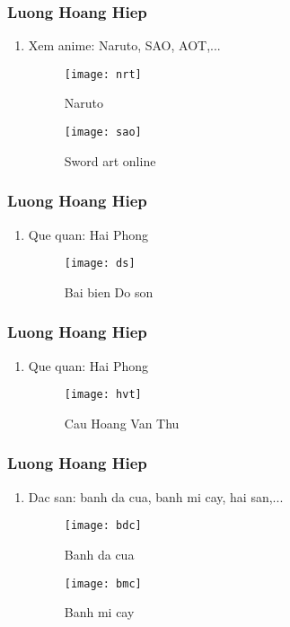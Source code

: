 \documentclass[12pt]{beamer}
\begin{document}
\begin{frame}
\frametitle{Luong Hoang Hiep}

\begin{enumerate}[+]
\item Xem anime: Naruto, SAO, AOT,...
\begin{figure}
\begin{minipage}{0.4\textwidth}\centerline{\texttt{[image: nrt]}}
\caption{Naruto}
\end{minipage}
\begin{minipage}{0.5\textwidth}\centerline{\texttt{[image: sao]}}
\caption{Sword art online}
\end{minipage}
\end{figure}

\end{enumerate}
\end{frame}
\begin{frame}
\frametitle{Luong Hoang Hiep}
\begin{enumerate}[9]
\item Que quan: Hai Phong
\begin{figure}
\begin{minipage}{0.4\textwidth}\centerline{\texttt{[image: ds]}}
\caption{Bai bien Do son}
\end{minipage}
\end{figure}

\end{enumerate}
\end{frame}
\begin{frame}
\frametitle{Luong Hoang Hiep}
\begin{enumerate}[9]
\item Que quan: Hai Phong
\begin{figure}
\begin{minipage}{0.5\textwidth}\centerline{\texttt{[image: hvt]}}
\caption{Cau Hoang Van Thu}
\end{minipage}
\end{figure}

\end{enumerate}
\end{frame}
\begin{frame}
\frametitle{Luong Hoang Hiep}
\begin{enumerate}[+]
\item Dac san: banh da cua, banh mi cay, hai san,...
\begin{figure}
\begin{minipage}{0.4\textwidth}\centerline{\texttt{[image: bdc]}}
\caption{Banh da cua}
\end{minipage}
\begin{minipage}{0.5\textwidth}\centerline{\texttt{[image: bmc]}}
\caption{Banh mi cay}
\end{minipage}
\end{figure}

\end{enumerate}
\end{frame}
\end{document}
